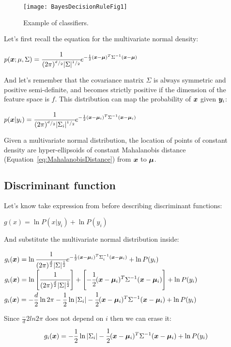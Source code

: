\begin{figure}[htp]
	\centering
	\texttt{[image: BayesDecisionRuleFig1]}
	\caption{Example of classifiers.}
	\label{fig:BayesDecisionRuleFig1}
\end{figure}
Let's first recall the equation for the multivariate normal density:
\begin{center}
	$\displaystyle p(\bm{x};\mu,\Sigma)=\cfrac{1}{(2\pi)^{{}^{d}/_{2}}\vert \Sigma \vert^{{}^{1}/_{2}}}e^{-\frac{1}{2}(\bm{x}-\bm{\mu})^T\Sigma^{-1}(\bm{x}-\bm{\mu})}$
\end{center}
And let's remember that the covariance matrix $\Sigma$ is always symmetric and positive semi-definite, and becomes strictly positive if the dimension of the feature space is $f$.\newline
This distribution can map the probability of $\bm{x}$ given $\bm{y}_i$:
\begin{center}
	$\displaystyle p(\bm{x}\vert y_i)=\cfrac{1}{(2\pi)^{{}^{d}/_{2}}\vert \Sigma_i \vert^{{}^{1}/_{2}}}e^{-\frac{1}{2}(\bm{x}-\bm{\mu}_i)^T\Sigma^{-1}(\bm{x}-\bm{\mu}_i)}$
\end{center}
Given a multivariate normal distribution, the location of points of constant density are hyper-ellipsoids of constant Mahalanobis distance (Equation~\ref{eq:MahalanobisDistance}) from $\bm{x}$ to $\bm{\mu}$. \newline
%
%
\subsection{Discriminant function}
Let's know take expression from before describing discriminant functions:
\begin{center}
	$\displaystyle g(x)=\ln{P(x\vert y_i)}+\ln{P(y_i)}$
\end{center}
And substitute the multivariate normal distribution inside:
\begin{center}
	$\displaystyle g_i(\bm{x})=\ln{\cfrac{1}{(2\pi)^{\frac{d}{2}}\vert \Sigma \vert^\frac{1}{2}}e^{-\frac{1}{2}(\bm{x}-\bm{\mu}_i)^T\Sigma_i^{-1}(\bm{x}-\bm{\mu}_i)}}+\ln{P(y_i)}$\\
	
	$\displaystyle g_i(\bm{x})=\ln{\left[\cfrac{1}{(2\pi)^{\frac{d}{2}}\vert \Sigma \vert^\frac{1}{2}}\right]}+\left[-\cfrac{1}{2}(\bm{x}-\bm{\mu}_i)^T\Sigma^{-1}(\bm{x}-\bm{\mu}_i) \right]+\ln{P(y_i)}$\\
	
	$\displaystyle g_i(\bm{x})=-\frac{d}{2}\ln{2\pi}-\frac{1}{2}\ln{\vert \Sigma_i \vert}-\cfrac{1}{2}(\bm{x}-\bm{\mu}_i)^T\Sigma^{-1}(\bm{x}-\bm{\mu}_i)+\ln{P(y_i)}$
\end{center}
Since  $\frac-{d}{2}ln2\pi$ does not depend on $i$ then we can erase it:
\begin{equation}
	g_i(\bm{x})=-\frac{1}{2}\ln{\vert \Sigma_i \vert}-\cfrac{1}{2}(\bm{x}-\bm{\mu}_i)^T\Sigma^{-1}(\bm{x}-\bm{\mu}_i)+\ln{P(y_i)}
	\label{eq:DiscriminantFunction}
\end{equation}
%
